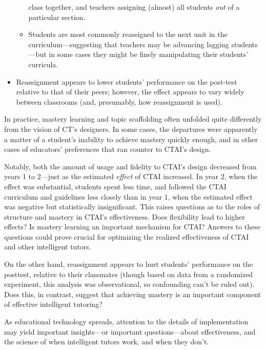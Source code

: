 \documentclass[notitlepage,12pt]{jedm}\usepackage[]{graphicx}\usepackage[]{color}
\begin{document}
\begin{itemize}
\begin{itemize}
     class together, and teachers assigning (almost) all students
     \emph{out} of a particular section.
   \item Students are most commonly reassigned to the next unit in the
     curriculum---suggesting that teachers may be advancing lagging
     students---but in some cases they might be finely manipulating
     their students' curricula.
   \end{itemize}
 \item Reassignment appears to lower students' performance on the
   post-test relative to that of their peers; however, the effect
   appears to vary widely between classrooms (and, presumably, how
   reassignment is used).
 \end{itemize}

In practice, mastery learning and topic scaffolding often unfolded
quite differently from the vision of CT's designers.
In some cases, the departures were apparently a matter of a student's inability
to achieve mastery quickly enough, and in other cases of educators' preferences that ran counter to CTAI's design.

Notably, both the amount of usage and fidelity to CTAI's design
decreased from years 1 to 2---just as the estimated \emph{effect} of
CTAI increased.
In year 2, when the effect was substantial, students spent less time,
and followed the CTAI curriculum and guidelines less closely than in
year 1, when the estimated effect was negative but statistically
insignificant.
This raises questions as to the roles of structure and mastery in
CTAI's effectiveness.
Does flexibility lead to higher effects? Is mastery learning an
important mechanism for CTAI?
Answers to these questions could prove crucial for optimizing the
realized effectiveness of CTAI and other intelligent tutors.

On the other hand, reassignment appears to hurt students' performance
on the posttest, relative to their classmates (though based on data
from a randomized experiment, this analysis was observational, so
confounding can't be ruled out).
Does this, in contrast, suggest that achieving mastery is an important
component of effective intelligent tutoring?

As educational technology spreads, attention to the details of
implementation may yield important insights---or important
questions---about effectiveness, and the science of when
intelligent tutors work, and when they don't.



\end{document}
